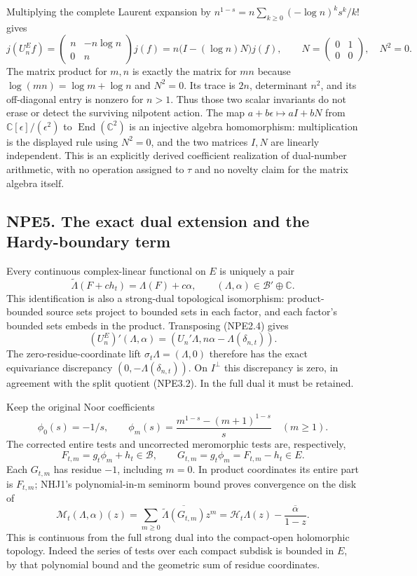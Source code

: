 Multiplying the complete Laurent expansion by
\(n^{1-s}=n\sum_{k\ge0}(-\log n)^ks^k/k!\) gives \[
j(U_n^Ef)=
\begin{pmatrix}n&-n\log n\\0&n\end{pmatrix}j(f)
=n\bigl(I-(\log n)N\bigr)j(f),\qquad
N=\begin{pmatrix}0&1\\0&0\end{pmatrix},\quad N^2=0.
\tag{NPE4.2}
\] The matrix product for \(m,n\) is exactly the matrix for \(mn\)
because \(\log(mn)=\log m+\log n\) and \(N^2=0\). Its trace is \(2n\),
determinant \(n^2\), and its off-diagonal entry is nonzero for \(n>1\).
Thus those two scalar invariants do not erase or detect the surviving
nilpotent action. The map \(a+b\epsilon\mapsto aI+bN\) from
\(\mathbb C[\epsilon]/(\epsilon^2)\) to
\(\operatorname{End}(\mathbb C^2)\) is an injective algebra
homomorphism: multiplication is the displayed rule using \(N^2=0\), and
the two matrices \(I,N\) are linearly independent. This is an explicitly
derived coefficient realization of dual-number arithmetic, with no
operation assigned to \(\tau\) and no novelty claim for the matrix
algebra itself.

\subsection{NPE5. The exact dual extension and the Hardy-boundary
term}\label{npe5.-the-exact-dual-extension-and-the-hardy-boundary-term}

Every continuous complex-linear functional on \(E\) is uniquely a pair
\[
\widetilde\Lambda(F+ch_t)=\Lambda(F)+c\alpha,
\qquad (\Lambda,\alpha)\in\mathcal B'\oplus\mathbb C.
\tag{NPE5.1}
\] This identification is also a strong-dual topological isomorphism:
product-bounded source sets project to bounded sets in each factor, and
each factor's bounded sets embeds in the product. Transposing (NPE2.4)
gives \[
(U_n^E)'(\Lambda,\alpha)=(U_n'\Lambda,n\alpha-\Lambda(\delta_{n,t})).
\tag{NPE5.2}
\] The zero-residue-coordinate lift \(\sigma_t\Lambda=(\Lambda,0)\)
therefore has the exact equivariance discrepancy
\((0,-\Lambda(\delta_{n,t}))\). On \(I^\perp\) this discrepancy is zero,
in agreement with the split quotient (NPE3.2). In the full dual it must
be retained.

Keep the original Noor coefficients \[
\phi_0(s)=-1/s,\qquad \phi_m(s)=\frac{m^{1-s}-(m+1)^{1-s}}s\quad(m\ge1).
\] The corrected entire tests and uncorrected meromorphic tests are,
respectively, \[
F_{t,m}=g_t\phi_m+h_t\in\mathcal B,
\qquad G_{t,m}=g_t\phi_m=F_{t,m}-h_t\in E.
\tag{NPE5.3}
\] Each \(G_{t,m}\) has residue \(-1\), including \(m=0\). In product
coordinates its entire part is \(F_{t,m}\); NHJ1's polynomial-in-m
seminorm bound proves convergence on the disk of \[
\mathcal M_t(\Lambda,\alpha)(z)
=\sum_{m\ge0}\overline{\widetilde\Lambda(G_{t,m})}z^m
=\mathcal H_t\Lambda(z)-\frac{\overline\alpha}{1-z}.
\tag{NPE5.4}
\] This is continuous from the full strong dual into the compact-open
holomorphic topology. Indeed the series of tests over each compact
subdisk is bounded in \(E\), by that polynomial bound and the geometric
sum of residue coordinates.

